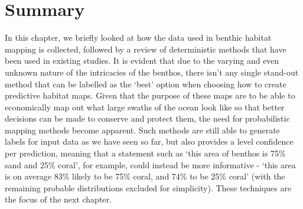\section{Summary}
In this chapter, we briefly looked at how the data used in benthic habitat mapping is collected, followed by a review of deterministic methods that have been used in existing studies. It is evident that due to the varying and even unknown nature of the intricacies of the benthos, there isn't any single stand-out method that can be labelled as the `best' option when choosing how to create predictive habitat maps. Given that the purpose of these maps are to be able to economically map out what large swaths of the ocean look like so that better decisions can be made to conserve and protect them, the need for probabilistic mapping methods become apparent. Such methods are still able to generate labels for input data as we have seen so far, but also provides a level confidence per prediction, meaning that a statement such as `this area of benthos is 75\% sand and 25\% coral', for example, could instead be more informative - `this area is on average 83\% likely to be 75\% coral, and 74\% to be 25\% coral' (with the remaining probable distributions excluded for simplicity). These techniques are the focus of the next chapter.

